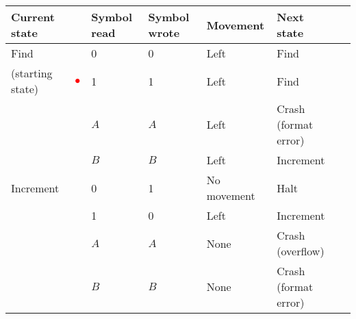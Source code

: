 \documentclass[convert={density=300,size=1080x800,outext=.png}]{standalone}
\newcommand{\ac}{\textcolor{red}{$\bullet$}}
\begin{document}
\begin{tabular}{|l|l|l|l|l|l|l|}
\hline
Current state    &     & Symbol read & Symbol wrote & Movement    & Next state           \\
\hline
Find             &     & 0           & 0            & Left        & Find                 \\
(starting state) & \ac & 1           & 1            & Left        & Find                 \\
                 &     & $A$         & $A$          & Left        & Crash (format error) \\
                 &     & $B$         & $B$          & Left        & Increment            \\
\hline
Increment        &     & 0           & 1            & No movement & Halt                 \\
                 &     & 1           & 0            & Left        & Increment            \\
                 &     & $A$         & $A$          & None        & Crash (overflow)     \\
                 &     & $B$         & $B$          & None        & Crash (format error) \\
\hline
\end{tabular}
\end{document}
